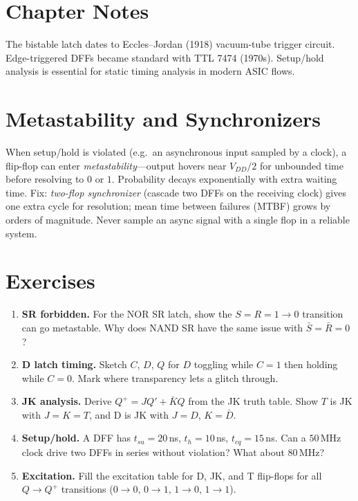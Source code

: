 \section{Chapter Notes}
The bistable latch dates to Eccles--Jordan (1918) vacuum-tube trigger circuit. Edge-triggered DFFs became
standard with TTL 7474 (1970s). Setup/hold analysis is essential for static timing analysis in modern ASIC flows.

\section{Metastability and Synchronizers}
When setup/hold is violated (e.g.\ an asynchronous input sampled by a clock), a flip-flop can enter \emph{metastability}---output
hovers near $V_{DD}/2$ for unbounded time before resolving to $0$ or $1$. Probability decays exponentially with extra waiting time.
Fix: \emph{two-flop synchronizer} (cascade two DFFs on the receiving clock) gives one extra cycle for resolution; mean time between
failures (MTBF) grows by orders of magnitude. Never sample an async signal with a single flop in a reliable system.


\section{Exercises}
\label{sec:ch04-exercises}
\begin{enumerate}[label=E4.\arabic*, leftmargin=*, itemsep=0.8em]
    \item \textbf{SR forbidden.} For the NOR SR latch, show the $S=R=1\to0$ transition can go metastable. Why does NAND SR have the same issue with $\bar S=\bar R=0$?
    \item \textbf{D latch timing.} Sketch $C$, $D$, $Q$ for $D$ toggling while $C=1$ then holding while $C=0$. Mark where transparency lets a glitch through.
    \item \textbf{JK analysis.} Derive $Q^+=JQ'+\bar KQ$ from the JK truth table. Show $T$ is JK with $J=K=T$, and D is JK with $J=D$, $K=\bar D$.
    \item \textbf{Setup/hold.} A DFF has $t_{su}=20$\,ns, $t_h=10$\,ns, $t_{cq}=15$\,ns. Can a $50$\,MHz clock drive two DFFs in series without violation? What about $80$\,MHz?
    \item \textbf{Excitation.} Fill the excitation table for D, JK, and T flip-flops for all $Q\to Q^+$ transitions ($0\to0$, $0\to1$, $1\to0$, $1\to1$).
\end{enumerate}
